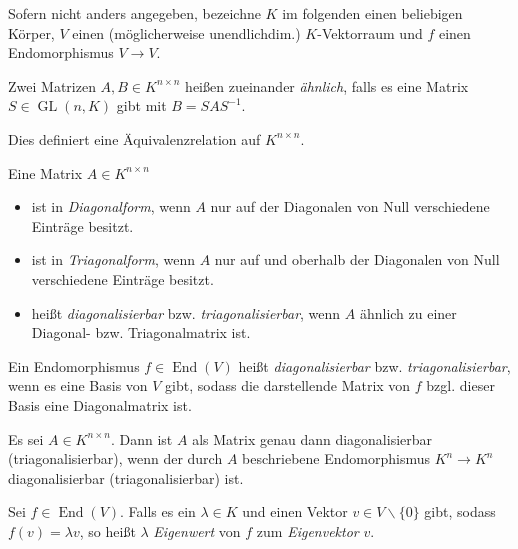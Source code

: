\documentclass{cheat-sheet}
\DeclareMathOperator{\GL}{GL}
\DeclareMathOperator{\End}{End}
\begin{document}

\begin{nota}
  Sofern nicht anders angegeben, bezeichne $K$ im folgenden einen beliebigen Körper, $V$ einen (möglicherweise unendlichdim.) $K$-Vektorraum und $f$ einen Endomorphismus $V \to V$.
\end{nota}

\begin{defn}
  Zwei Matrizen $A, B \in K^{n \times n}$ heißen zueinander \emph{ähnlich}, falls es eine Matrix $S \in \GL(n, K)$ gibt mit $B = SAS^{-1}$.
\end{defn}

\begin{bem}
  Dies definiert eine Äquivalenzrelation auf $K^{n \times n}$.
\end{bem}

\begin{defn}
  Eine Matrix $A \in K^{n \times n}$
  \begin{itemize}
    \item ist in \emph{Diagonalform}, wenn $A$ nur auf der Diagonalen von Null verschiedene Einträge besitzt.
    \item ist in \emph{Triagonalform}, wenn $A$ nur auf und oberhalb der Diagonalen von Null verschiedene Einträge besitzt.
    \item heißt \emph{diagonalisierbar} bzw. \emph{triagonalisierbar}, wenn $A$ ähnlich zu einer Diagonal- bzw. Triagonalmatrix ist.
  \end{itemize}
  Ein Endomorphismus $f \in \End(V)$ heißt \emph{diagonalisierbar} bzw. \emph{triagonalisierbar}, wenn es eine Basis von $V$ gibt, sodass die darstellende Matrix von $f$ bzgl. dieser Basis eine Diagonalmatrix ist.
\end{defn}

\begin{satz}
  Es sei $A \in K^{n \times n}$. Dann ist $A$ als Matrix genau dann diagonalisierbar (triagonalisierbar), wenn der durch $A$ beschriebene Endomorphismus $K^n \to K^n$ diagonalisierbar (triagonalisierbar) ist.
\end{satz}

\begin{defn}
  Sei $f \in \End(V)$. Falls es ein $\lambda \in K$ und einen Vektor $v \in V \backslash \{ 0 \}$ gibt, sodass $f(v) = \lambda v$, so heißt $\lambda$ \emph{Eigenwert} von $f$ zum \emph{Eigenvektor} $v$.
\end{defn}
\end{document}
